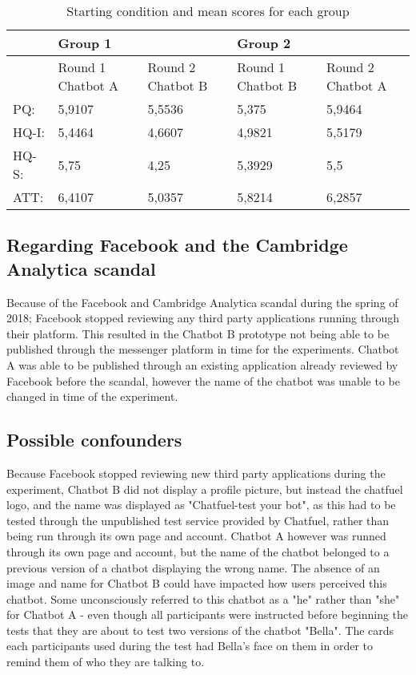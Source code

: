 \begin{table}[H]
\centering
\begin{tabular}{lll|ll}
\hline
& Group 1 &  & Group 2 &  \\
\hline
& Round 1 Chatbot A & Round 2 Chatbot B & Round 1 Chatbot B & Round 2 Chatbot A \\
\hline
PQ: & 5,9107 & 5,5536 & 5,375 & 5,9464 \\
HQ-I: & 5,4464 & 4,6607 & 4,9821 & 5,5179 \\
HQ-S: & 5,75 & 4,25 & 5,3929 & 5,5 \\
ATT: & 6,4107 & 5,0357 & 5,8214 & 6,2857 \\
\end{tabular}
\caption{Starting condition and mean scores for each group}
    \label{tab:startconmean}
\end{table}


\subsection{Regarding Facebook and the Cambridge Analytica scandal}

Because of the Facebook and Cambridge Analytica scandal during the spring of 2018; Facebook stopped reviewing any third party applications running through their platform. This resulted in the Chatbot B prototype not being able to be published through the messenger platform in time for the experiments. Chatbot A was able to be published through an existing application already reviewed by Facebook before the scandal, however the name of the chatbot was unable to be changed in time of the experiment.

\subsection{Possible confounders}
Because Facebook stopped reviewing new third party applications during the experiment, Chatbot B did not display a profile picture, but instead the chatfuel logo, and the name was displayed as "Chatfuel-test your bot", as this had to be tested through the unpublished test service provided by Chatfuel, rather than being run through its own page and account. Chatbot A however was runned through its own page and account, but the name of the chatbot belonged to a previous version of a chatbot displaying the wrong name. The absence of an image and name for Chatbot B could have impacted how users perceived this chatbot. Some unconsciously referred to this chatbot as a "he" rather than "she" for Chatbot A - even though all participants were instructed before beginning the tests that they are about to test two versions of the chatbot "Bella". The cards each participants used during the test had Bella's face on them in order to remind them of who they are talking to. 

